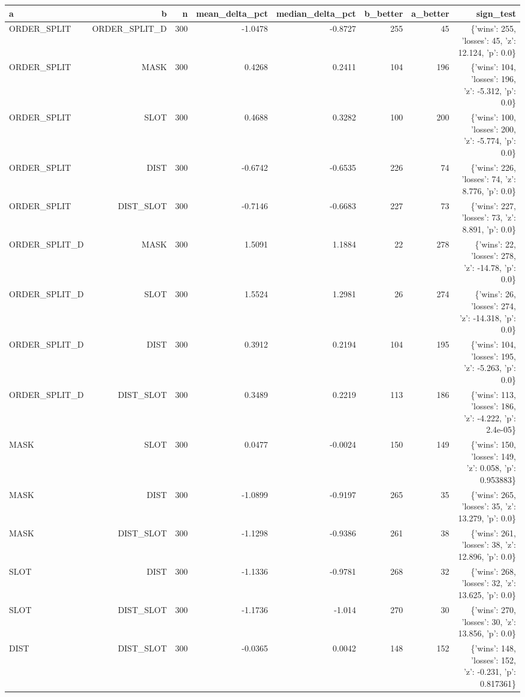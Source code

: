 \begin{tabular}{lrrrrrrr}
\toprule
a & b & n & mean\_delta\_pct & median\_delta\_pct & b\_better & a\_better & sign\_test \\
\midrule
ORDER\_SPLIT & ORDER\_SPLIT\_D & 300 & -1.0478 & -0.8727 & 255 & 45 & \{'wins': 255, 'losses': 45, 'z': 12.124, 'p': 0.0\} \\
ORDER\_SPLIT & MASK & 300 & 0.4268 & 0.2411 & 104 & 196 & \{'wins': 104, 'losses': 196, 'z': -5.312, 'p': 0.0\} \\
ORDER\_SPLIT & SLOT & 300 & 0.4688 & 0.3282 & 100 & 200 & \{'wins': 100, 'losses': 200, 'z': -5.774, 'p': 0.0\} \\
ORDER\_SPLIT & DIST & 300 & -0.6742 & -0.6535 & 226 & 74 & \{'wins': 226, 'losses': 74, 'z': 8.776, 'p': 0.0\} \\
ORDER\_SPLIT & DIST\_SLOT & 300 & -0.7146 & -0.6683 & 227 & 73 & \{'wins': 227, 'losses': 73, 'z': 8.891, 'p': 0.0\} \\
ORDER\_SPLIT\_D & MASK & 300 & 1.5091 & 1.1884 & 22 & 278 & \{'wins': 22, 'losses': 278, 'z': -14.78, 'p': 0.0\} \\
ORDER\_SPLIT\_D & SLOT & 300 & 1.5524 & 1.2981 & 26 & 274 & \{'wins': 26, 'losses': 274, 'z': -14.318, 'p': 0.0\} \\
ORDER\_SPLIT\_D & DIST & 300 & 0.3912 & 0.2194 & 104 & 195 & \{'wins': 104, 'losses': 195, 'z': -5.263, 'p': 0.0\} \\
ORDER\_SPLIT\_D & DIST\_SLOT & 300 & 0.3489 & 0.2219 & 113 & 186 & \{'wins': 113, 'losses': 186, 'z': -4.222, 'p': 2.4e-05\} \\
MASK & SLOT & 300 & 0.0477 & -0.0024 & 150 & 149 & \{'wins': 150, 'losses': 149, 'z': 0.058, 'p': 0.953883\} \\
MASK & DIST & 300 & -1.0899 & -0.9197 & 265 & 35 & \{'wins': 265, 'losses': 35, 'z': 13.279, 'p': 0.0\} \\
MASK & DIST\_SLOT & 300 & -1.1298 & -0.9386 & 261 & 38 & \{'wins': 261, 'losses': 38, 'z': 12.896, 'p': 0.0\} \\
SLOT & DIST & 300 & -1.1336 & -0.9781 & 268 & 32 & \{'wins': 268, 'losses': 32, 'z': 13.625, 'p': 0.0\} \\
SLOT & DIST\_SLOT & 300 & -1.1736 & -1.014 & 270 & 30 & \{'wins': 270, 'losses': 30, 'z': 13.856, 'p': 0.0\} \\
DIST & DIST\_SLOT & 300 & -0.0365 & 0.0042 & 148 & 152 & \{'wins': 148, 'losses': 152, 'z': -0.231, 'p': 0.817361\} \\
\bottomrule
\end{tabular}
